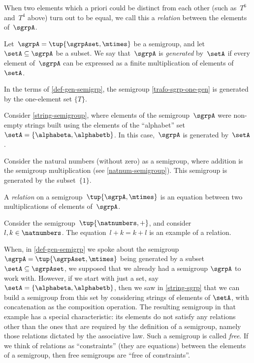 When two elements which a priori could be distinct from each other (such as~$T^6$ and~$T^4$ above) turn out to be equal, we call this a \emph{relation} between the elements of~$\sgrpA$.

\begin{definition}\label{def-gen-semigrp}
Let~$\sgrpA = \tup{\sgrpAset, \mtimes}$ be a semigroup, and let~$\setA \subseteq \sgrpA$ be a subset.
We say that~$\sgrpA$ is \emph{generated} by~$\setA$ if every element of~$\sgrpA$ can be expressed as a finite multiplication of elements of~$\setA$.
\end{definition}

\begin{remark}
In the terms of \cref{def-gen-semigrp}, the semigroup \cref{trafo-sgrp-one-gen} is generated by the one-element set $\{ T \}$. 
\end{remark}

\begin{example}
Consider \cref{string-semigroup}, where elements of the semigroup~$\sgrpA$ were non-empty strings built using the elements of the ``alphabet'' set~$\setA = \{ \alphabeta, \alphabetb\}$.
In this case,~$\sgrpA$ is generated by~$\setA$.
\end{example}


\begin{example}
Consider the natural numbers (without zero) as a semigroup, where addition is the semigroup multiplication (see \cref{natnum-semigroup}). This semigroup is generated by the subset~$\{1 \}$.
\end{example}

\begin{definition}
A \emph{relation} on a semigroup~$\tup{\sgrpA, \mtimes}$ is an equation between two multiplications of elements of~$\sgrpA$.
\end{definition}

\begin{example}
Consider the semigroup~$\tup{\natnumbers, +}$, and consider~$l, k \in \natnumbers$. The equation~$l + k = k + l$ is an example of  a relation.
\end{example}

When, in \cref{def-gen-semigrp} we spoke about the semigroup $\sgrpA = \tup{\sgrpAset, \mtimes}$  being generated by a subset $\setA \subseteq \sgrpAset$, we supposed that we already had a semigroup $\sgrpA$ to work with. However, if we start with just a set, say $\setA = \{ \alphabeta, \alphabetb\}$, then we saw in \cref{string-sgrp} that we can build a semigroup from this set by considering strings of elements of $\setA$, with concatenation as the composition operation. The resulting semigroup in that example has a special characteristic: its elements do not satisfy any relations other than the ones that are required by the definition of a semigroup, namely those relations dictated by the associative law. Such a semigroup is called \emph{free}. If we think of relations as ``constraints'' (they are equations) between the elements of a semigroup, then free semigroups are ``free of constraints''. 


